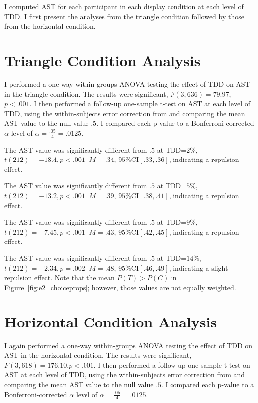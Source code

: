 I computed AST for each participant in each display condition at each level of TDD. I first present the analyses from the triangle condition followed by those from the horizontal condition. 

\section{Triangle Condition Analysis}
I performed a one-way within-groups ANOVA testing the effect of TDD on AST in the triangle condition. The results were significant, $\textit{F}(3,636)=79.97$,$\textit{p}<.001$. 
I then performed a follow-up one-sample t-test on AST at each level of TDD, using the within-subjects error correction from \textcite{cousineau2014error} and comparing the mean AST value to the null value $.5$. I compared each p-value to a Bonferroni-corrected $\alpha$ level of $\alpha=\frac{.05}{4}=.0125$. 

The AST value was significantly different from $.5$ at TDD=$2\%$, $\textit{t}(212)=-18.4,\textit{p}<.001$, $\textit{M}=.34$, $95\%\text{CI}[.33,.36]$, indicating a repulsion effect. 

The AST value was significantly different from $.5$ at TDD=$5\%$, $\textit{t}(212)=-13.2,\textit{p}<.001$, $\textit{M}=.39$, $95\%\text{CI}[.38,.41]$, indicating a repulsion effect. 

The AST value was significantly different from $.5$ at TDD=$9\%$, $\textit{t}(212)=-7.45,\textit{p}<.001$, $\textit{M}=.43$, $95\%\text{CI}[.42,.45]$, indicating a repulsion effect. 

The AST value was significantly different from $.5$ at TDD=$14\%$, $\textit{t}(212)=-2.34,\textit{p}=.002$, $\textit{M}=.48$, $95\%\text{CI}[.46,.49]$, indicating a slight repulsion effect. Note that the mean $P(T)>P(C)$ in Figure~\ref{fig:e2_choiceprops}; however, those values are not equally weighted.

\section{Horizontal Condition Analysis}
I again performed a one-way within-groups ANOVA testing the effect of TDD on AST in the horizontal condition. The results were significant, $\textit{F}(3,618)=176.10$,$\textit{p}<.001$. 
I then performed a follow-up one-sample t-test on AST at each level of TDD, using the within-subjects error correction from \textcite{cousineau2014error} and comparing the mean AST value to the null value $.5$. I compared each p-value to a Bonferroni-corrected $\alpha$ level of $\alpha=\frac{.05}{4}=.0125$. 


